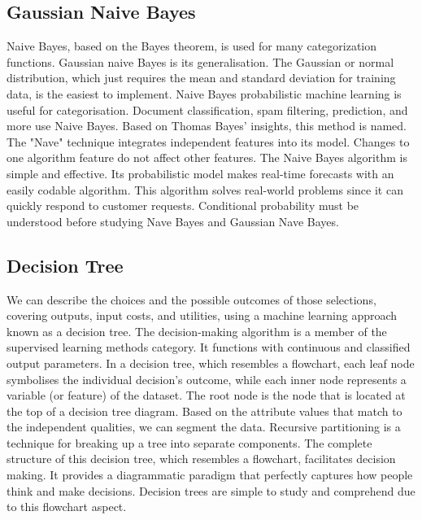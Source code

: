\documentclass[conference]{IEEEtran}
\begin{document}
\subsection{Gaussian Naive Bayes}
Naive Bayes, based on the Bayes theorem, is used for many categorization functions. Gaussian naive Bayes is its generalisation. The Gaussian or normal distribution, which just requires the mean and standard deviation for training data, is the easiest to implement. Naive Bayes probabilistic machine learning is useful for categorisation. Document classification, spam filtering, prediction, and more use Naive Bayes. Based on Thomas Bayes' insights, this method is named. The "Nave" technique integrates independent features into its model. Changes to one algorithm feature do not affect other features. The Naive Bayes algorithm is simple and effective. Its probabilistic model makes real-time forecasts with an easily codable algorithm. This algorithm solves real-world problems since it can quickly respond to customer requests. Conditional probability must be understood before studying Nave Bayes and Gaussian Nave Bayes.
\subsection{Decision Tree}
We can describe the choices and the possible outcomes of those selections, covering outputs, input costs, and utilities, using a machine learning approach known as a decision tree. The decision-making algorithm is a member of the supervised learning methods category. It functions with continuous and classified output parameters. In a decision tree, which resembles a flowchart, each leaf node symbolises the individual decision's outcome, while each inner node represents a variable (or feature) of the dataset. The root node is the node that is located at the top of a decision tree diagram. Based on the attribute values that match to the independent qualities, we can segment the data. Recursive partitioning is a technique for breaking up a tree into separate components. The complete structure of this decision tree, which resembles a flowchart, facilitates decision making. It provides a diagrammatic paradigm that perfectly captures how people think and make decisions. Decision trees are simple to study and comprehend due to this flowchart aspect.
\end{document}
